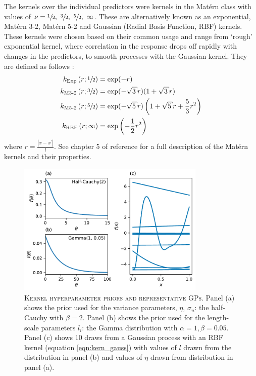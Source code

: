 The kernels over the individual predictors were kernels in the Mat\'{e}rn class with values of $\nu=\sfrac{1}{2},\ \sfrac{3}{2},\ \sfrac{5}{2},\ \infty$. These are alternatively known as an exponential, Mat\'{e}rn 3-2, Mat\'{e}rn 5-2 and  Gaussian (Radial Basis Function, RBF) kernels.  These kernels were chosen based on their common usage \cite{shahriariTakingHumanOut2016} and  range from `rough' exponential kernel, where correlation in the response drops off rapidly with changes in the predictors, to smooth processes with the Gaussian kernel. They are defined as follows \cite{rasmussenGaussianProcessesMachine2006}: 
\begin{align}
k_{\text{Exp}}\left(r; \sfrac{1}{2}\right) &=\exp (-r) \label{eqn:kern_exp}\\
k_{\text{M3-2}}\left(r; \sfrac{3}{2}\right) &= \exp (-\sqrt{3} r)(1+\sqrt{3} r) \label{eqn:kern_m32} \\
k_{\text{M5-2}}\left(r; \sfrac{5}{2}\right) &= \exp (-\sqrt{5} r)\left(1+\sqrt{5} r+\frac{5}{3} r^{2}\right) \label{eqn:kern_m52}\\
k_{\text{RBF}}\left(r; \infty\right) &= \exp \left(-\frac{1}{2} r^{2}\right) \label{eqn:kern_gauss}
\end{align}
where $r = \frac{|x-x^{\prime}|}{l}$. See chapter 5 of  reference \cite{rasmussenGaussianProcessesMachine2006} for a full description of the Mat\'{e}rn kernels and their properties.  

\begin{figure}
    \centering
    \includegraphics[width=0.8\textwidth]{chapters/msm_optimization/figures/prior_functions.pdf}
    \caption[Kernel hyperparameter priors and representative GPs]{\textsc{Kernel hyperparameter priors and representative GPs}. Panel (a) shows the prior used for the variance parameters, $\eta$, $\sigma_n$: the half-Cauchy with $\beta=2$. Panel (b) shows the prior used for the length-scale parameters $l_{i}$: the Gamma distribution with $\alpha=1, \beta=0.05$.  Panel (c) shows 10 draws from a Gaussian process with an RBF kernel (equation \ref{eqn:kern_gauss}) with values of $l$ drawn from the distribution in panel (b) and values of $\eta$ drawn from distribution in panel (a).}
    \label{fig:priors}
\end{figure}

